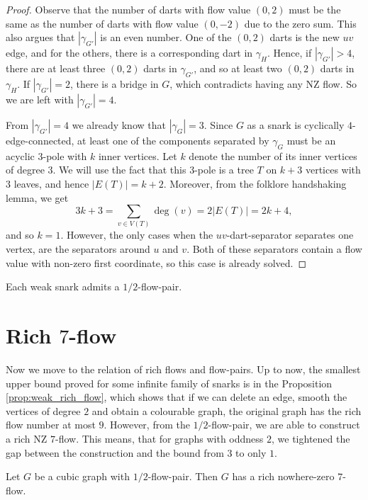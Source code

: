\begin{proof}
Observe that the number of darts with flow value $(0, 2)$ must be the same as the number of darts with flow value $(0, -2)$ due to the zero sum. This also argues that $|\gamma_{G'}|$ is an even number. One of the $(0,2)$ darts is the new $uv$ edge, and for the others, there is a corresponding dart in $\gamma_H$. Hence, if $|\gamma_{G'}|>4$, there are at least three $(0,2)$ darts in $\gamma_{G'}$, and so at least two $(0,2)$ darts in $\gamma_H$. If $|\gamma_{G'}|=2$, there is a bridge in $G$, which contradicts having any NZ flow. So we are left with $|\gamma_{G'}|=4$.

From $|\gamma_{G'}|=4$ we already know that $|\gamma_{G}|=3$. Since $G$ as a snark is cyclically $4$-edge-connected, at least one of the components separated by $\gamma_{G}$ must be an acyclic $3$-pole with $k$ inner vertices. Let $k$ denote the number of its inner vertices of degree $3$. We will use the fact that this $3$-pole is a tree $T$ on $k+3$ vertices with $3$ leaves, and hence $|E(T)|=k+2$. Moreover, from the folklore handshaking lemma, we get
\begin{equation*}
 3k+3 = \sum_{v\in V(T)} \deg(v) = 2|E(T)|=2k+4,
\end{equation*}
and so $k=1$. However, the only cases when the $uv$-dart-separator separates one vertex, are the separators around $u$ and $v$. Both of these separators contain a flow value with non-zero first coordinate, so this case is already solved.
\end{proof}

\begin{corollary}
Each weak snark admits a $1/2$-flow-pair.
\end{corollary}

\section{Rich $7$-flow}

Now we move to the relation of rich flows and flow-pairs. Up to now, the smallest upper bound proved for some infinite family of snarks is in the Proposition \ref{prop:weak_rich_flow}, which shows that if we can delete an edge, smooth the vertices of degree $2$ and obtain a colourable graph, the original graph has the rich flow number at most $9$. However, from the $1/2$-flow-pair, we are able to construct a rich NZ $7$-flow. This means, that for graphs with oddness $2$, we tightened the gap between the construction and the bound from $3$ to only $1$.

\begin{theorem}
Let $G$ be a cubic graph with $1/2$-flow-pair. Then $G$ has a rich nowhere-zero $7$-flow.
\end{theorem}

